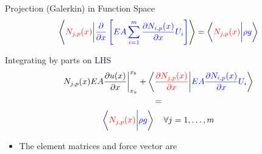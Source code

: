 \documentclass{beamer}
\newcommand{\pd}[2]{\frac{\partial #1}{\partial #2}}
\begin{document}
\begin{frame}[allowframebreaks]
  \begin{block}{Projection (Galerkin) in Function Space}
    \begin{equation}\nonumber
      \left\langle  {\color{red}{N_{j,p}(x)}} \bigg\vert {\color{blue}{\pd{}{x} \left[ EA \sum_{i=1}^{m} \pd{N_{i,p}(x)}{x}  U_i  \right]}} \right\rangle  =
      \left\langle  {\color{red}{N_{j,p}(x)}} \bigg\vert {\color{blue}{\rho g}} \right\rangle 
    \end{equation}
  \end{block}
  \begin{block}{Integrating by parts on LHS}
    \begin{equation}\nonumber
      \begin{gathered}
        {{N_{j,p}(x) EA \pd{u(x)}{x}}}  \bigg\vert_{x_a}^{x_b} +  \left\langle {\color{red}{\pd{N_{j,p}(x)}{x}}}  \bigg\vert  {\color{blue}{EA  \pd{N_{i,p}(x)}{x}  U_i}}   \right\rangle \\
        = \\
        \left\langle {\color{red}{N_{j,p}(x)}} \bigg\vert {\color{blue}{\rho g}} \right\rangle \quad \forall j = 1, \ldots,m
      \end{gathered}
    \end{equation}
  \end{block}

  \begin{itemize}
    \item The element matrices and force vector are


\end{itemize}
\end{frame}
\end{document}
